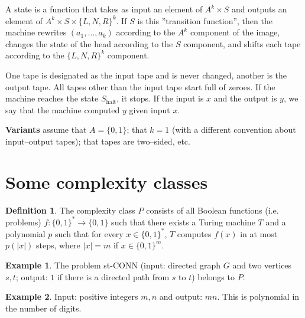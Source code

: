 \documentclass{article}
\theoremstyle{definition}
\newtheorem{example}{Example}[section]
\newtheorem{defn}{Definition}[section]
\begin{document}
A state is a function that takes as input an element of $A^k \times S$ and outputs an element of $A^k \times S \times \{L, N, R\}^k$. If $S$ is this ''transition function'', then the machine rewrites $(a_1,\ldots,a_k)$ according to the $A^k$ component of the image, changes the state of the head according to the $S$ component, and shifts each tape according to the $\{L,N,R\}^k$ component.
\vspace{1mm}
 
One tape is designated as the input tape and is never changed, another is the output tape. All tapes other than the input tape start full of zeroes. If the machine reaches the state $S_{\text{halt}}$, it stops. If the input is $x$ and the output is $y$, we say that the machine computed $y$ given input $x$.
\vspace{1mm}
 
\textbf{Variants} assume that $A = \{0,1\}$; that $k=1$ (with a different convention about input--output tapes); that tapes are two--sided, etc.

\section{Some complexity classes}

\begin{defn}
    The complexity class $P$ consists of all Boolean functions (i.e. problems) $f: \{0,1\}^* \to \{0,1\}$ such that there exists a Turing machine $T$ and a polynomial $p$ such that for every $x \in \{0,1\}^*$, $T$ computes $f(x)$ in at most $p(|x|)$ steps, where $|x| = m$ if $x \in \{0,1\}^m$.
\end{defn}

\begin{example}
    The problem st-CONN (input: directed graph $G$ and two vertices $s,t$; output: $1$ if there is a directed path from $s$ to $t$) belongs to $P$.
\end{example}
\begin{example}
    Input: positive integers $m,n$ and output: $mn$. This is polynomial in the number of digits.
\end{example}
\end{document}
